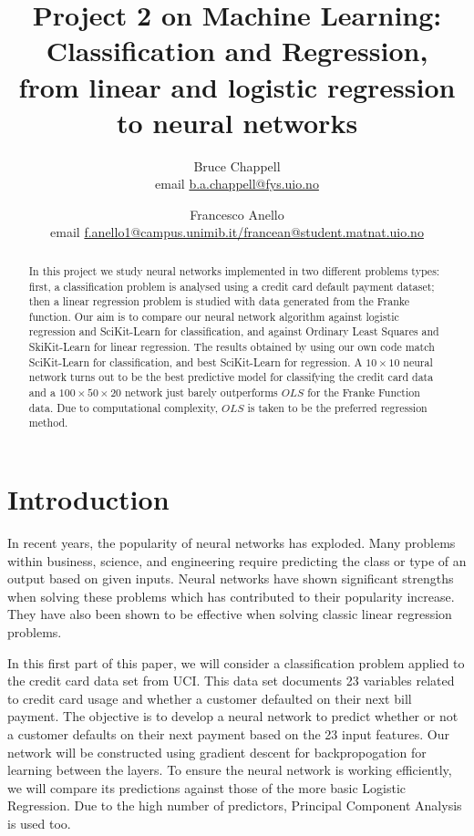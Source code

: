 \documentclass{emulateapj}
\begin{document}
\title{Project 2 on Machine Learning:
\\Classification and Regression,\\ from linear and logistic regression to neural networks}

\author{Bruce Chappell \\ email \href{b.a.chappell@fys.uio.no}{b.a.chappell@fys.uio.no} \\
\and Francesco Anello \\ email \href{f.anello1@campus.unimib.it}{f.anello1@campus.unimib.it/francean@student.matnat.uio.no} }

\begin{abstract}
In this project we study neural networks implemented in two different problems types: first, a classification problem is analysed using a credit card default payment dataset; then a linear regression problem is studied with data generated from the Franke function. Our aim is to compare our neural network algorithm against logistic regression and SciKit-Learn for classification, and against Ordinary Least Squares and SkiKit-Learn for linear regression.
The results obtained by using our own code match SciKit-Learn for classification, and best SciKit-Learn for regression. A $10 \times 10$ neural network turns out to be the best predictive model for classifying the credit card data and a $100\times50\times20$ network just barely outperforms $OLS$ for the Franke Function data. Due to computational complexity, $OLS$ is taken to be the preferred regression method.

\end{abstract}

\section{Introduction}
\label{sec:introduction}
In recent years, the popularity of neural networks has exploded. Many problems within business, science, and engineering require predicting the class or type of an output based on given inputs. Neural networks have shown significant strengths when solving these problems which has contributed to their popularity increase. They have also been shown to be effective when solving classic linear regression problems.

In this first part of this paper, we will consider a classification problem applied to the credit card data set from UCI. This data set documents 23 variables related to credit card usage and whether a customer defaulted on their next bill payment. The objective is to develop a neural network to predict whether or not a customer defaults on their next payment based on the 23 input features. Our network will be constructed using gradient descent for backpropogation for learning between the layers. To ensure the neural network is working efficiently, we will compare its predictions against those of the more basic Logistic Regression. Due to the high number of predictors, Principal Component Analysis is used too.
\end{document}
